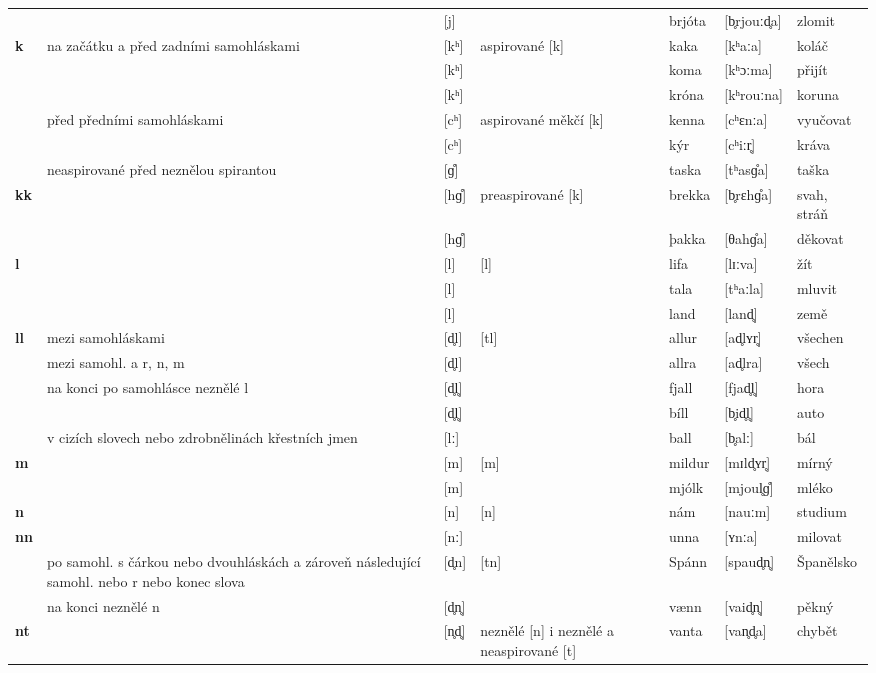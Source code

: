 \begin{longtable}{>{\bfseries}lX>{\IPAFont}lXl>{\IPAFont}ll}
 &  & {[j]} &   & brjóta & {[b̥rjouːd̥a]} & zlomit \\ 
k & na začátku a před zadními samohláskami & {[kʰ]} & aspirované [k] & kaka & {[kʰaːa]} & koláč \\ 
 &  & {[kʰ]} &   & koma & {[kʰɔːma]} & přijít \\ 
 &  & {[kʰ]} &   & króna & {[kʰrouːna]} & koruna \\ 
 & před předními samohláskami & {[cʰ]} & aspirované měkčí [k] & kenna & {[cʰɛnːa]} & vyučovat \\ 
 &  & {[cʰ]} &   & kýr & {[cʰiːr̥]} & kráva \\ 
 & neaspirované před neznělou spirantou & {[ɡ̊]} &   & taska & {[tʰasɡ̊a]} & taška \\ 
kk &  & {[hɡ̊]} & preaspirované [k] & brekka & {[b̥rɛhɡ̊a]} & svah, stráň \\ 
 &  & {[hɡ̊]} &   & þakka & {[θahɡ̊a]} & děkovat \\ 
l &  & {[l]} & [l] & lifa & {[lɪːva]} & žít \\ 
 &  & {[l]} &   & tala & {[tʰaːla]} & mluvit \\ 
 &  & {[l]} &   & land & {[land̥]} & země \\ 
ll & mezi samohláskami & {[d̥l]} & [tl] & allur & {[ad̥lʏr̥]} & všechen \\ 
 & mezi samohl. a r, n, m & {[d̥l]} &   & allra & {[ad̥lra]} & všech \\ 
 & na konci po samohlásce neznělé l & {[d̥l̥]} &   & fjall & {[fjad̥l̥]} & hora \\ 
 &  & {[d̥l̥]} &   & bíll & {[b̥id̥l̥]} & auto \\ 
 & v cizích slovech nebo zdrobnělinách křestních jmen & {[lː]} &  & ball & {[b̥alː]} & bál \\ 
m &  & {[m]} & [m] & mildur & {[mɪld̥ʏr̥]} & mírný \\ 
 &  & {[m]} &   & mjólk & {[mjoul̥ɡ̊]} & mléko \\ 
n &  & {[n]} & [n] & nám & {[nauːm]} & studium \\ 
nn &  & {[nː]} &   & unna & {[ʏnːa]} & milovat \\ 
 & po samohl. s čárkou nebo dvouhláskách a zároveň následující samohl. nebo r nebo konec slova & {[d̥n]} & [tn] & Spánn & {[spaud̥n̥]} & Španělsko \\ 
 & na konci neznělé n & {[d̥n̥]} &   & vænn & {[vaid̥n̥]} & pěkný \\ 
nt &  & {[n̥d̥]} & neznělé [n] i neznělé a neaspirované [t] & vanta & {[van̥d̥a]} & chybět \\ 

\end{longtable}

